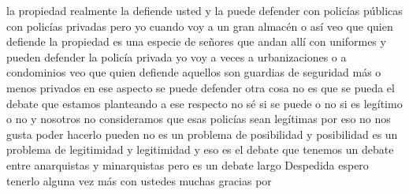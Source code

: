 la propiedad realmente la defiende usted y la puede defender con policías públicas con policías privadas
pero yo cuando voy a un gran almacén o así veo que quien defiende la propiedad es una especie de señores que andan allí con uniformes y pueden defender la policía privada
yo voy a veces a urbanizaciones o a condominios veo que quien defiende aquellos son guardias de seguridad
más o menos privados en ese aspecto se puede defender otra cosa no es que se pueda
el debate que estamos planteando a ese respecto no sé si se puede o no si es legítimo o no y nosotros
no consideramos que esas policías sean legítimas por eso no nos gusta poder hacerlo pueden no es un problema de posibilidad y posibilidad
es un problema de legitimidad y legitimidad y eso es el debate que tenemos un debate entre anarquistas y minarquistas pero es un debate largo
Despedida
espero tenerlo alguna vez más con ustedes muchas gracias por

